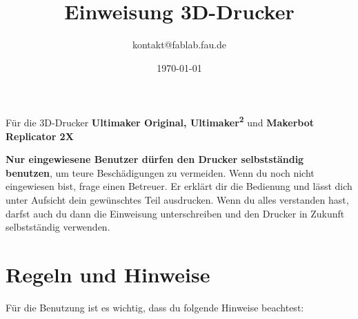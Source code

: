 \documentclass{\basedir/fablab-document}
\date{\today}
\author{kontakt@fablab.fau.de}
\title{Einweisung 3D-Drucker}
\newcommand{\ts}[1]{\textsuperscript{#1}}
\begin{document}
\maketitle
\begin{center}
	Für die 3D-Drucker \textbf{Ultimaker Original, Ultimaker\ts2} und \textbf{Makerbot Replicator 2X}
\end{center}

\textbf{Nur eingewiesene Benutzer dürfen den Drucker selbstständig benutzen}, um teure Beschädigungen zu vermeiden. Wenn du noch nicht eingewiesen bist, frage einen Betreuer. Er erklärt dir die Bedienung und lässt dich unter Aufsicht dein gewünschtes Teil ausdrucken. Wenn du alles verstanden hast, darfst auch du dann die Einweisung unterschreiben und den Drucker in Zukunft selbstständig verwenden.

\section{Regeln und Hinweise}
Für die Benutzung ist es wichtig, dass du folgende Hinweise beachtest:
\end{document}
